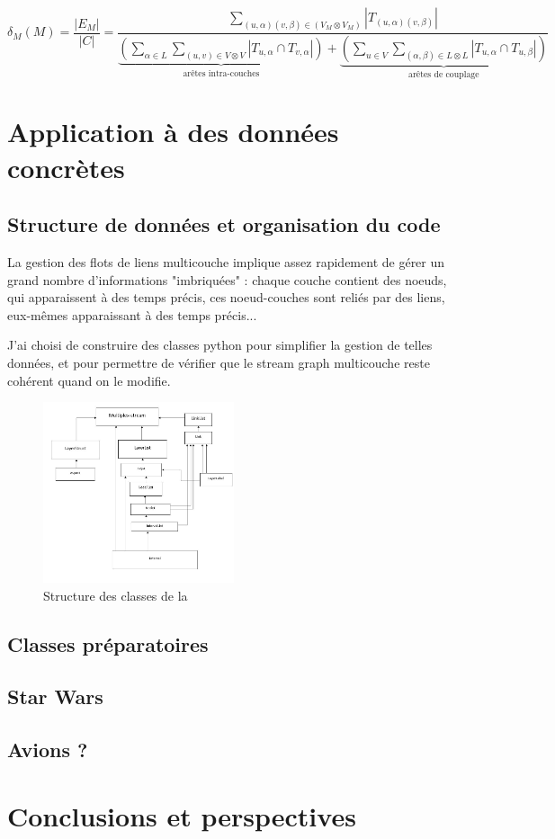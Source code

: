 \documentclass[11pt,a4paper]{article}
\theoremstyle{definition}
\theoremstyle{remark}
\theoremstyle{remark}
\begin{document}
	\[
		\delta_M (M) = 
		\frac{|E_M|}{|C|}= 
		\frac{\sum_{(u,\alpha)(v,\beta) \in (V_M \otimes V_M)} |T_{(u,\alpha)(v,\beta)}|}
		{\underbrace{(\sum_{\alpha \in L}\sum_{(u,v) \in V\otimes V}|T_{u,\alpha} \cap T_{v,\alpha}|)}_{\text{arêtes intra-couches}}+\underbrace{( \sum_{u \in V } \sum_{(\alpha,\beta) \in L \otimes L}|T_{u,\alpha}\cap T_{u,\beta}|)}_{\text{arêtes de couplage}}}
	\]

	
\section{Application à des données concrètes}

\subsection{Structure de données et organisation du code} 
\label{descode}

	La gestion des flots de liens multicouche implique assez rapidement de gérer un grand nombre d'informations "imbriquées" : chaque couche contient des noeuds, qui apparaissent à des temps précis, ces noeud-couches sont reliés par des liens, eux-mêmes apparaissant à des temps précis...
	
	J'ai choisi de construire des classes python pour simplifier la gestion de telles données, et pour permettre de vérifier que le stream graph multicouche reste cohérent quand on le modifie.
	
	\begin{figure}[H]
		\centering
		\includegraphics[width=0.5\textwidth]{codeStructure.JPG}
		\caption{Structure des classes de la }
	\end{figure}

\subsection{Classes préparatoires}
\subsection{Star Wars}
\subsection{Avions ?}

\section{Conclusions et perspectives}

    \nocite{*}
    
	
\end{document}
